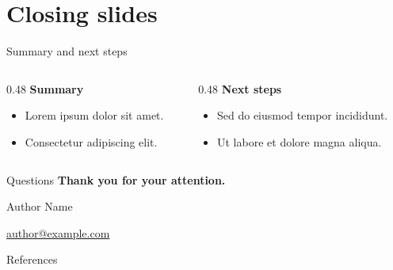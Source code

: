 \section{Closing slides}

\begin{frame}[t]{Summary and next steps}
    \begin{columns}[T,onlytextwidth]
        \begin{column}{0.48\textwidth}
            \textbf{Summary}
            \begin{itemize}
                \item Lorem ipsum dolor sit amet.
                \item Consectetur adipiscing elit.
            \end{itemize}
        \end{column}
        \begin{column}{0.48\textwidth}
            \textbf{Next steps}
            \begin{itemize}
                \item Sed do eiusmod tempor incididunt.
                \item Ut labore et dolore magna aliqua.
            \end{itemize}
        \end{column}
    \end{columns}
\end{frame}

\begin{frame}{Questions}
    \centering
    \textbf{Thank you for your attention.}
    \par\bigskip
    Author Name
    \par\medskip
    \url{author@example.com}
\end{frame}

\begin{frame}[t,allowframebreaks]{References}
    \printbibliography[heading=none]
\end{frame}
